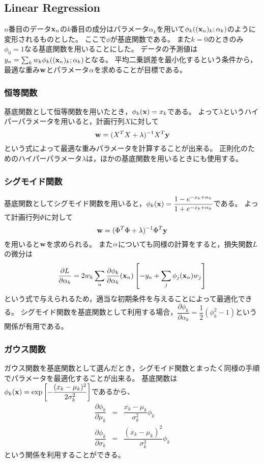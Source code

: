\documentclass{jarticle}
\begin{document}
\subsection{Linear Regression}
$n$番目のデータ${\bf x}_n$の$k$番目の成分はパラメータ$\alpha_k$を用いて$\phi_k ( ({\bf x}_n)_k ;\alpha_k)$のように変形されるものとした。
ここで$\phi$が基底関数である。
また$k=0$のときのみ$\phi_0 = 1$なる基底関数を用いることにした。
データの予測値は$y_n = \sum_k w_k \phi_k ( ({\bf x}_n )_k ; \alpha_k)$となる。
平均二乗誤差を最小化するという条件から，最適な重み${\bf w}$とパラメータ${\bf \alpha}$を求めることが目標である。

\subsubsection{恒等関数}
基底関数として恒等関数を用いたとき，$\phi_k ({\bf x}) = x_k$である。
よって$\lambda$というハイパーパラメータを用いると，計画行列$X$に対して
\[
{\bf w} = (X^T X+\lambda)^{-1} X^T {\bf y}
\]
という式によって最適な重みパラメータを計算することが出来る。
正則化のためのハイパーパラメータ$\lambda$は，ほかの基底関数を用いるときにも使用する。

\subsubsection{シグモイド関数}
基底関数としてシグモイド関数を用いると，$\phi_k ({\bf x}) = \dfrac{1-e^{-x_k+\alpha_k}}{1+e^{-x_k+\alpha_k}}$である。
よって計画行列$\Phi$に対して
\[
{\bf w} = (\Phi^T \Phi+\lambda)^{-1} \Phi^T {\bf y}
\]
を用いると${\bf w}$を求められる。
また${\bf \alpha}$についても同様の計算をすると，損失関数$L$の微分は
\[
\dfrac{\partial L}{\partial \alpha_k} = 2 w_k \sum_n \dfrac{\partial \phi_k}{\partial \alpha_k} ({\bf x}_n) \left[ -y_n+\sum_j \phi_j ({\bf x}_n) w_j \right]
\]
という式で与えられるため，適当な初期条件を与えることによって最適化できる。
シグモイド関数を基底関数として利用する場合，$\dfrac{\partial \phi_k}{\partial \alpha_k} = \dfrac{1}{2}(\phi_k^2-1)$という関係が有用である。

\subsubsection{ガウス関数}
ガウス関数を基底関数として選んだとき，シグモイド関数とまったく同様の手順でパラメータを最適化することが出来る。
基底関数は$\phi_k ({\bf x}) = \exp \left[ -\dfrac{(x_k-\mu_k)^2}{2 \sigma_k^2} \right]$であるから、
\begin{eqnarray*}
\dfrac{\partial \phi_k}{\partial \mu_k} &=& \dfrac{x_k-\mu_k}{\sigma_k^2} \phi_k \\
\dfrac{\partial \phi_k}{\partial \sigma_k} &=& \dfrac{(x_k-\mu_k)^2}{\sigma_k^3} \phi_k
\end{eqnarray*}
という関係を利用することができる。
\end{document}
